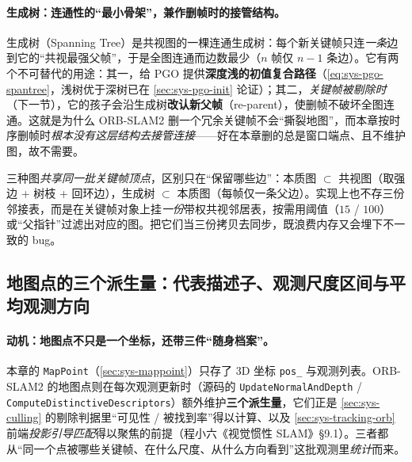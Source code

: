 \paragraph{生成树：连通性的“最小骨架”，兼作删帧时的接管结构。}
生成树（Spanning Tree）是共视图的一棵连通生成树：每个新关键帧只连\emph{一条}边到它的“共视最强父帧”，于是全图连通而边数最少（$n$ 帧仅 $n-1$ 条边）。它有两个不可替代的用途：其一，给 PGO 提供\textbf{深度浅的初值复合路径}（\cref{eq:sys-pgo-spantree}，浅树优于深树已在 \cref{sec:sys-pgo-init} 论证）；其二，\emph{关键帧被剔除时}（下一节），它的孩子会沿生成树\textbf{改认新父帧}（re-parent），使删帧不破坏全图连通。这就是为什么 ORB-SLAM2 删一个冗余关键帧不会“撕裂地图”，而本章按时序删帧时\emph{根本没有这层结构去接管连接}——好在本章删的总是窗口端点、且不维护图，故不需要。

\begin{pitfall}
三种图\emph{共享同一批关键帧顶点}，区别只在“保留哪些边”：本质图 $\subset$ 共视图（取强边 + 树枝 + 回环边），生成树 $\subset$ 本质图（每帧仅一条父边）。实现上也不存三份邻接表，而是在关键帧对象上挂\emph{一份}带权共视邻居表，按需用阈值（$15$ / $100$）或“父指针”过滤出对应的图。把它们当三份拷贝去同步，既浪费内存又会埋下不一致的 bug。
\end{pitfall}

\subsection{地图点的三个派生量：代表描述子、观测尺度区间与平均观测方向}
\label{sec:sys-mappoint-derived}

\paragraph{动机：地图点不只是一个坐标，还带三件“随身档案”。}
本章的 \texttt{MapPoint}（\cref{sec:sys-mappoint}）只存了 3D 坐标 \texttt{pos\_} 与观测列表。ORB-SLAM2 的地图点则在每次观测更新时（源码的 \texttt{UpdateNormalAndDepth} / \texttt{ComputeDistinctiveDescriptors}）额外维护\textbf{三个派生量}，它们正是 \cref{sec:sys-culling} 的剔除判据里“可见性 / 被找到率”得以计算、以及 \cref{sec:sys-tracking-orb} 前端\emph{投影引导匹配}得以聚焦的前提（程小六《视觉惯性 SLAM》§9.1）。三者都从“同一个点被哪些关键帧、在什么尺度、从什么方向看到”这批观测里\emph{统计}而来。

